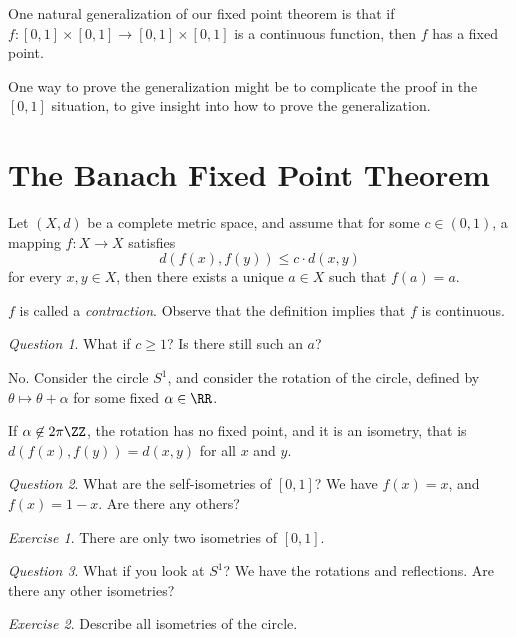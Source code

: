 \documentclass{article}
\theoremstyle{remark}
\newtheorem*{question}{Question}
\newtheorem{exercise}{Exercise}
\begin{document}
One natural generalization of our fixed point theorem is that
if $f:[0,1]\times [0,1] \to [0,1]\times [0,1]$ is a continuous 
function, then $f$ has a fixed point.

One way to prove the generalization might be to complicate
the proof in the $[0,1]$ situation, to give insight into
how to prove the generalization.

\section{The Banach Fixed Point Theorem}

\begin{theorem}
    Let $(X,d)$ be a complete metric space, and assume that
    for some $c\in (0,1)$, a mapping $f:X\to X$ satisfies
    \[ d(f(x),f(y)) \le c \cdot d(x,y) \]
    for every $x,y\in X$,
    then there exists a unique $a\in X$ such that $f(a)=a$.

    $f$ is called a \emph{contraction}. Observe that the definition
    implies that $f$ is continuous.
\end{theorem}

\begin{question}
    What if $c\ge 1$? Is there still such an $a$?
\end{question}

No. Consider the circle $S^1$, and consider the rotation
of the circle, defined by
$\theta \mapsto \theta + \alpha$ for some fixed $\alpha \in\RR$.

If $\alpha \not\in 2\pi \ZZ$, the rotation has no fixed point,
and it is an isometry, that is $d(f(x),f(y)) = d(x,y)$ for all
$x$ and $y$.

\begin{question}
    What are the self-isometries of $[0,1]$?
    We have $f(x)=x$, and $f(x)=1-x$. Are there any others?
\end{question}

\begin{exercise}
    There are only two isometries of $[0,1]$.
\end{exercise}

\begin{question}
    What if you look at $S^1$? We have the rotations
    and reflections. Are there any other isometries?
\end{question}

\begin{exercise}
    Describe all isometries of the circle.
\end{exercise}
\end{document}
